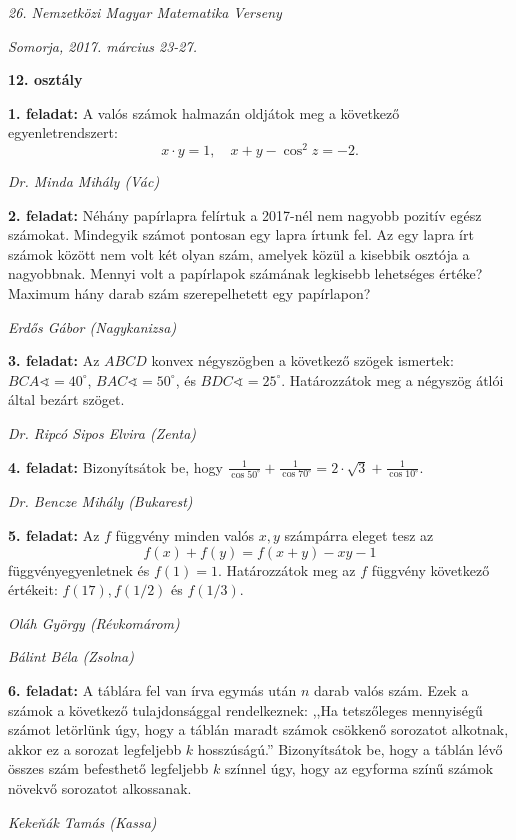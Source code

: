 \documentclass[a4paper,10pt]{article}
\newcommand{\ki}[2]{\hfill {\it #1 (#2)}\medskip}
\begin{document}
\begin{center} \Large {\em 26. Nemzetközi Magyar Matematika Verseny} \end{center}
\begin{center} \large{\em Somorja, 2017. március 23-27.} \end{center}
\smallskip
\begin{center} \large{\bf 12. osztály} \end{center}
\bigskip 

{\bf 1. feladat: } A valós számok halmazán oldjátok meg a következő egyenletrendszert:
$$x\cdot y=1,\quad x+y-\cos^2z=-2.$$

\ki{Dr. Minda Mihály}{Vác}\medskip

{\bf 2. feladat: } Néhány papírlapra felírtuk a 2017-nél nem nagyobb pozitív egész számokat. Mindegyik számot pontosan egy
lapra írtunk fel. Az egy lapra írt számok között nem volt két olyan szám, amelyek közül a kisebbik osztója a
nagyobbnak. Mennyi volt a papírlapok számának legkisebb lehetséges értéke? Maximum hány darab szám
szerepelhetett egy papírlapon?

\ki{Erdős Gábor}{Nagykanizsa}\medskip

{\bf 3. feladat: } Az $ABCD$ konvex négyszögben a következő szögek ismertek:
$BCA\sphericalangle=40^\circ$, $BAC\sphericalangle=50^\circ$, és $BDC\sphericalangle=25^\circ$. Határozzátok meg a
négyszög átlói által bezárt szöget.

\ki{Dr. Ripcó Sipos Elvira}{Zenta}\medskip

{\bf 4. feladat: } Bizonyítsátok be, hogy
$\displaystyle{\frac{1}{\cos 50^\circ}+
\frac{1}{\cos 70^\circ}=2\cdot \sqrt{3}+\frac{1}{\cos 10^\circ}}$.\smallskip

\ki{Dr. Bencze Mihály}{Bukarest}\medskip

{\bf 5. feladat: } Az $f$ függvény minden valós 
$x, y$ számpárra eleget tesz az 
$$f(x)+f(y)=f(x+y)-xy-1$$
függvényegyenletnek és $f(1)=1$. Határozzátok meg az $f$ függvény következő értékeit: 
$f(17), f(1/2)$ és $f(1/3)$.

\ki{Oláh György}{Révkomárom}

\ki{Bálint Béla}{Zsolna}\medskip

{\bf 6. feladat: } A táblára fel van írva egymás után $n$ darab valós szám. Ezek a számok a következő tulajdonsággal
rendelkeznek: ,,Ha tetszőleges mennyiségű számot letörlünk úgy, hogy a táblán maradt számok csökkenő
sorozatot alkotnak, akkor ez a sorozat legfeljebb $k$ hosszúságú.'' Bizonyítsátok be, hogy a táblán lévő összes
szám befesthető legfeljebb $k$ színnel úgy, hogy az egyforma színű számok növekvő sorozatot alkossanak.

\ki{Keke\v{n}ák Tamás}{Kassa}\medskip
\end{document}
